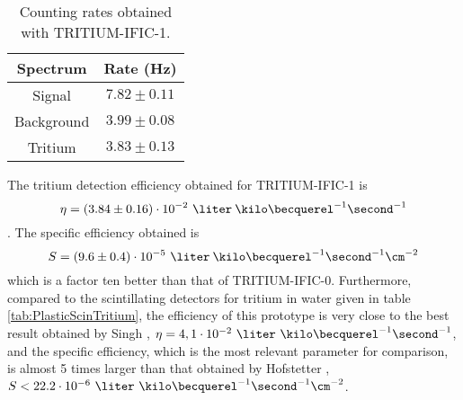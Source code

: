 \begin{table}[htbp]
\centering{}%
\begin{tabular}{cc}
\toprule 
Spectrum & Rate (Hz) \tabularnewline
\midrule
\midrule 
Signal & $7.82 \pm 0.11$ \tabularnewline
Background & $3.99 \pm 0.08$ \tabularnewline  
Tritium & $3.83 \pm 0.13$ \tabularnewline
\bottomrule
\end{tabular}
\caption{Counting rates obtained with TRITIUM-IFIC-1.}
\label{tab:CountsPerSecondTRITIUMIFIC1}
\end{table}
The tritium detection efficiency obtained for TRITIUM-IFIC-1 is 
$$\eta=(3.84 \pm 0.16)\cdot{} 10^{-2}~\liter\:\kilo\becquerel^{-1}\second^{-1}$$. The specific efficiency obtained is
$$S=(9.6 \pm 0.4)\cdot{} 10^{-5}~\liter\:\kilo\becquerel^{-1}\second^{-1}\cm^{-2}$$
which is a factor ten better than that of TRITIUM-IFIC-0. Furthermore, compared to the scintillating detectors for tritium in water given in table \ref{tab:PlasticScinTritium}, the efficiency of this prototype is very close to the best result obtained by Singh \cite{Ratnakaran, Ratnakaran2000}, $\eta=4,1 \cdot{} 10^{-2}~\liter\ \kilo\becquerel^{-1}\second^{-1}$, and the specific efficiency, which is the most relevant parameter for comparison, is almost 5 times larger than that obtained by Hofstetter \cite{Hofstetter1, Hofstetter2}, $S<22.2 \cdot{} 10^{-6}~\liter\ \kilo\becquerel^{-1}\second^{-1}\cm^{-2}$.
